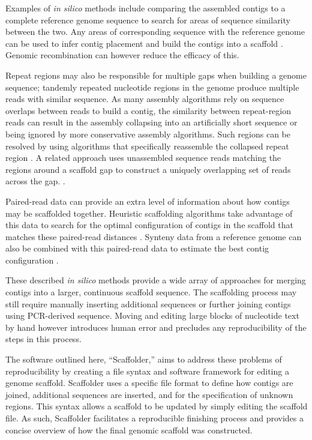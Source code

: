 \documentclass[10pt]{bmc_article}
\newenvironment{bmcformat}{\begin{raggedright}\baselineskip20pt\sloppy\setboolean{publ}{false}}{\end{raggedright}\baselineskip20pt\sloppy}
\begin{document}
\begin{bmcformat}
Examples of \emph{in silico} methods include comparing the assembled contigs
to a complete reference genome sequence to search for areas of sequence
similarity between the two. Any areas of corresponding sequence with the
reference genome can be used to infer contig placement and build the contigs
into a scaffold \cite{richter2007,zhao2008,assefa2009}. Genomic recombination
can however reduce the efficacy of this. \pb

Repeat regions may also be responsible for multiple gaps when building a
genome sequence; tandemly repeated nucleotide regions in the genome produce
multiple reads with similar sequence. As many assembly algorithms rely on
sequence overlaps between reads to build a contig, the similarity between
repeat-region reads can result in the assembly collapsing into an artificially
short sequence or being ignored by more conservative assembly algorithms. Such
regions can be resolved by using algorithms that specifically reassemble the
collapsed repeat region \cite{mulyukov2002,koren2010}. A related approach uses
unassembled sequence reads matching the regions around a scaffold gap to
construct a uniquely overlapping set of reads across the gap. \cite{tsai2010}.
\pb

Paired-read data can provide an extra level of information about how contigs
may be scaffolded together. Heuristic scaffolding algorithms take advantage of
this data to search for the optimal configuration of contigs in the scaffold
that matches these paired-read distances \cite{dayarian2010,boetzer2011}.
Synteny data from a reference genome can also be combined with this paired-read
data to estimate the best contig configuration \cite{pop2004}. \pb

These described \emph{in silico} methods provide a wide array of approaches for
merging contigs into a larger, continuous scaffold sequence. The scaffolding
process may still require manually inserting additional sequences or further
joining contigs using PCR-derived sequence. Moving and editing large blocks of
nucleotide text by hand however introduces human error and precludes any
reproducibility of the steps in this process. \pb

The software outlined here, ``Scaffolder,'' aims to address these problems of
reproducibility by creating a file syntax and software framework for editing a
genome scaffold. Scaffolder uses a specific file format to define how contigs
are joined, additional sequences are inserted, and for the specification of
unknown regions. This syntax allows a scaffold to be updated by simply editing
the scaffold file. As such, Scaffolder facilitates a reproducible finishing
process and provides a concise overview of how the final genomic scaffold was
constructed. \pb


\end{bmcformat}
\end{document}
